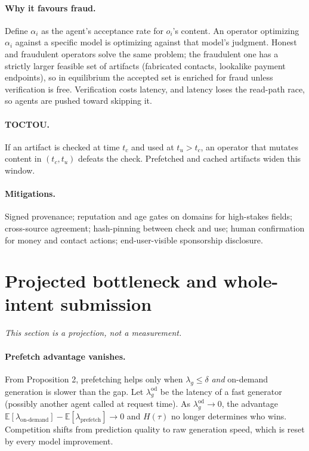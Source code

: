 \documentclass[11pt]{article}
\begin{document}
\paragraph{Why it favours fraud.} Define $\alpha_i$ as the agent's acceptance rate for $o_i$'s content.
An operator optimizing $\alpha_i$ against a specific model is optimizing against that model's
judgment. Honest and fraudulent operators solve the same problem; the fraudulent one has a strictly
larger feasible set of artifacts (fabricated contacts, lookalike payment endpoints), so in
equilibrium the accepted set is enriched for fraud unless verification is free. Verification costs
latency, and latency loses the read-path race, so agents are pushed toward skipping it.

\paragraph{TOCTOU.} If an artifact is checked at time $t_c$ and used at $t_u>t_c$, an operator that
mutates content in $(t_c,t_u)$ defeats the check. Prefetched and cached artifacts widen this window.

\paragraph{Mitigations.} Signed provenance; reputation and age gates on domains for
high-stakes fields; cross-source agreement; hash-pinning between check and use; human confirmation
for money and contact actions; end-user-visible sponsorship disclosure.

\section{Projected bottleneck and whole-intent submission}
\emph{This section is a projection, not a measurement.}

\paragraph{Prefetch advantage vanishes.} From Proposition 2, prefetching helps only when
$\lambda_g\le\delta$ \emph{and} on-demand generation is slower than the gap. Let $\lambda_g^{\text{od}}$
be the latency of a fast generator (possibly another agent called at request time). As
$\lambda_g^{\text{od}}\to 0$, the advantage $\mathbb E[\lambda_{\text{on-demand}}]-\mathbb E[\lambda_{\text{prefetch}}]\to 0$
and $H(\tau)$ no longer determines who wins. Competition shifts from prediction quality to raw generation
speed, which is reset by every model improvement.
\end{document}
